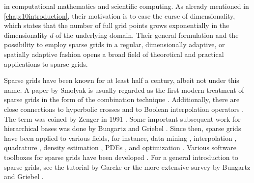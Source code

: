 
\label{chap:20sparseGrids}

in computational mathematics and scientific computing.
As already mentioned in \cref{chap:10introduction},
their motivation is to ease the curse of dimensionality,
which states that the number of full grid points
grows exponentially in the dimensionality $d$ of the underlying domain.
Their general formulation and the possibility to employ sparse grids in a
regular, dimensionally adaptive, or spatially adaptive fashion
opens a broad field of theoretical and practical applications
to sparse grids.

Sparse grids have been known for at least half a century,
albeit not under this name.
A paper by Smolyak \cite{Smolyak63Quadrature} is usually regarded
as the first modern treatment of sparse grids in the form
of the combination technique \cite{Garcke13Sparse}.
Additionally, there are close connections to
hyperbolic crosses \cite{Temljakov82Approximation}
and to Boolean interpolation operators
.
The term  was coined by Zenger in 1991
\cite{Zenger91Sparse}.
Some important subsequent work for hierarchical bases was done by
Bungartz and Griebel
.
Since then, sparse grids have been applied to various fields,
for instance,
data mining
,
interpolation
\cite{Sickel11Spline},
quadrature
\cite{Gerstner98Numerical},
density estimation
,
PDEs
, and
optimization
.
Various software toolboxes for sparse grids have been developed
.
For a general introduction to sparse grids,
see the tutorial by Garcke \cite{Garcke13Sparse} or
the more extensive survey by Bungartz and Griebel
\cite{Bungartz04Sparse}.

